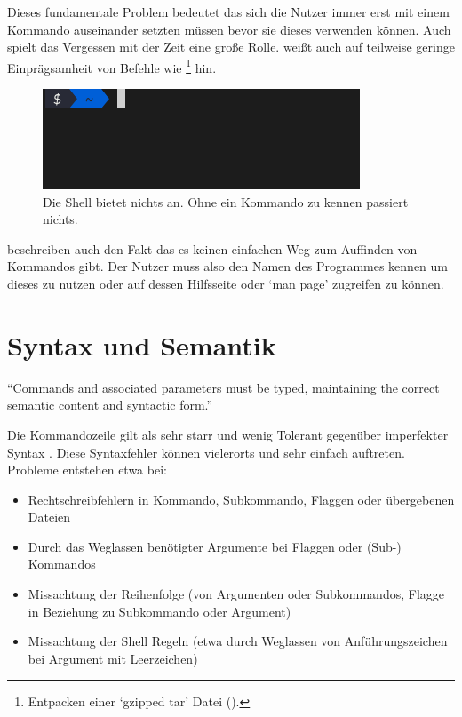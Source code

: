 \documentclass[oneside,bibliography=totocnumbered,BCOR=5mm]{scrbook}
\begin{document}
\bigskip

Dieses fundamentale Problem bedeutet das sich die Nutzer immer erst mit einem
Kommando auseinander setzten müssen bevor sie dieses verwenden können. Auch
spielt das Vergessen mit der Zeit eine große Rolle. \textcite{Raskin_2008} weißt
auch auf teilweise geringe Einprägsamheit von Befehle wie \footnote{Entpacken einer `gzipped tar' Datei ().} hin.

\begin{figure}[H]
  \centering
  \includegraphics[scale=0.5]{empty-prompt.png}
  \caption{Die Shell bietet nichts an. Ohne ein Kommando zu kennen passiert nichts.}
\end{figure}

\textcite{Gentner_1996} beschreiben auch den Fakt das es keinen einfachen Weg zum
Auffinden von Kommandos gibt. Der Nutzer muss also den Namen des Programmes
kennen um dieses zu nutzen oder auf dessen Hilfsseite oder `man page' zugreifen
zu können.

\section{Syntax und Semantik}

``Commands and associated parameters must be typed, maintaining the correct
semantic content and syntactic form.'' \parencite[184]{Westerman_1997}

\bigskip

\newcommand{\refss}[1]{\hyperref[prob:ss]{#1}}

\bigskip

Die Kommandozeile gilt als sehr starr und wenig Tolerant gegenüber imperfekter
Syntax \parencite{Gentner_1996}.
Diese Syntaxfehler können vielerorts und sehr einfach auftreten. Probleme entstehen etwa bei:

\begin{itemize}
  \item Rechtschreibfehlern in Kommando, Subkommando, Flaggen oder übergebenen Dateien
  \item Durch das Weglassen benötigter Argumente bei Flaggen oder (Sub-) Kommandos
  \item Missachtung der Reihenfolge (von Argumenten oder Subkommandos, Flagge in Beziehung zu Subkommando oder Argument)
  \item Missachtung der Shell Regeln (etwa durch Weglassen von Anführungszeichen bei Argument mit Leerzeichen)
\end{itemize}
\end{document}
